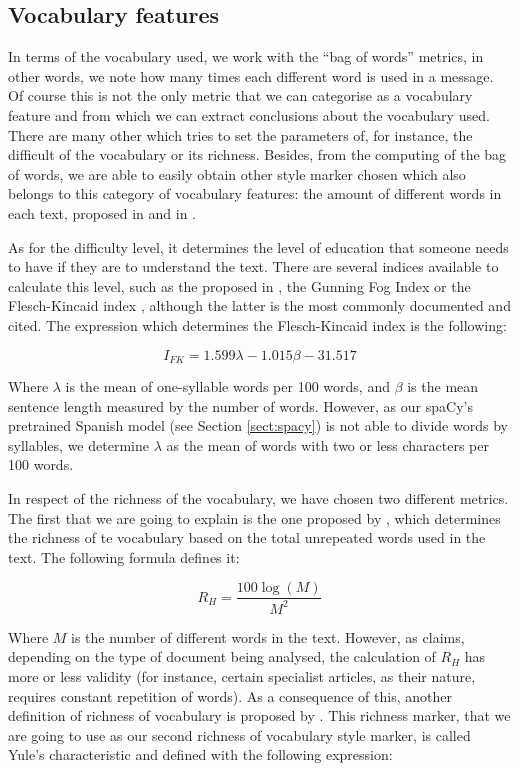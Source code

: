 \subsection{Vocabulary features}\label{ssect:vocabf}

In terms of the vocabulary used, we work with the ``bag of words'' metrics, in other words, we note how many times each different word is used in a message. Of course this is not the only metric that we can categorise as a vocabulary feature and from which we can extract conclusions about the vocabulary used. There are many other which tries to set the parameters of, for instance, the difficult of the vocabulary or its richness. Besides, from the computing of the bag of words, we are able to easily obtain other style marker chosen which also belongs to this category of vocabulary features: the amount of different words in each text, proposed in \cite{ril2014determination} and in \cite{corney2001identifying}.

As for the difficulty level, it determines the level of education that someone needs to have if they are to understand the text. There are several indices available to calculate this level, such as the proposed in \cite{dale1948formula}, the Gunning Fog Index \citep{wiki:gunning} or the Flesch-Kincaid index \citep{dubay2004principles}, although the latter is the most commonly documented and cited. The expression which determines the Flesch-Kincaid index is the following:

$$
I_{FK} = 1.599\lambda-1.015\beta-31.517
$$

Where $\lambda$ is the mean of one-syllable words per 100 words, and $\beta$ is the mean sentence length measured by the number of words. However, as our spaCy's pretrained Spanish model (see Section \ref{sect:spacy}) is not able to divide words by syllables, we determine $\lambda$ as the mean of words with two or less characters per 100 words.

In respect of the richness of the vocabulary, we have chosen two different metrics. The first that we are going to explain is the one proposed by \cite{honore1979some}, which determines the richness of te vocabulary based on the total unrepeated words used in the text. The following formula defines it:

$$
R_H = \frac{100\log(M)}{M^2}
$$

Where $M$ is the number of different words in the text. However, as \cite{ril2014determination} claims, depending on the type of document being analysed, the calculation of $R_H$ has more or less validity (for instance, certain specialist articles, as their nature, requires constant repetition of words). As a consequence of this, another definition of richness of vocabulary is proposed by \cite{yule2014statistical}. This richness marker, that we are going to use as our second richness of vocabulary style marker, is called Yule's characteristic and defined with the following expression:

